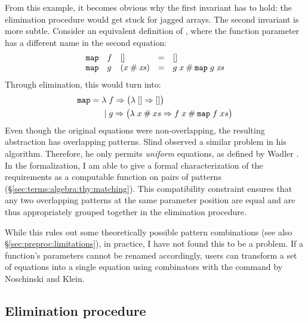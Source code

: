 From this example, it becomes obvious why the first invariant has to hold:
the elimination procedure would get stuck for jagged arrays.
The second invariant is more subtle.
Consider an equivalent definition of , where the function parameter has a different name in the second equation:
%
\[
  \begin{array}{lllcl}
    \texttt{\textup{map}}&f&[] &=& [] \\
    \texttt{\textup{map}}&g&(x \mathbin{\mathtt{\#}} \mathit{xs}) &=& g\;x \mathbin{\mathtt{\#}} \texttt{\textup{map}}\;g\;\mathit{xs}
  \end{array}
\]
%
Through elimination, this would turn into:
%
\begin{align*}
\texttt{\textup{map}} = \lambda\; &f \Rightarrow \big(\lambda\; [] \Rightarrow []\big) \\
|\;&g \Rightarrow \big(\lambda\; x \mathbin{\mathtt{\#}} xs \Rightarrow f\;x \mathbin{\mathtt{\#}} \texttt{\textup{map}}\;f\;xs\big)
\end{align*}
%
Even though the original equations were non-overlapping, the resulting abstraction has overlapping patterns.
Slind observed a similar problem \cite[§3.3.2]{slind1999terminating} in his algorithm.
Therefore, he only permits \emph{uniform} equations, as defined by Wadler \cite[§5.5]{peytonjones1987implementation}.
In the formalization, I am able to give a formal characterization of the requirements as a computable function on pairs of patterns (§\ref{sec:terms:algebra:thy:matching}).
This compatibility constraint ensures that any two overlapping patterns at the same parameter position are equal and are thus appropriately grouped together in the elimination procedure.

While this rules out some theoretically possible pattern combinations (see also §\ref{sec:preproc:limitations}), in practice, I have not found this to be a problem.
If a function's parameters cannot be renamed accordingly, users can transform a set of equations into a single equation using  combinators with the  command by Noschinski and Klein.

\subsection{Elimination procedure}
\label{sec:intermediate:elim:proc}

